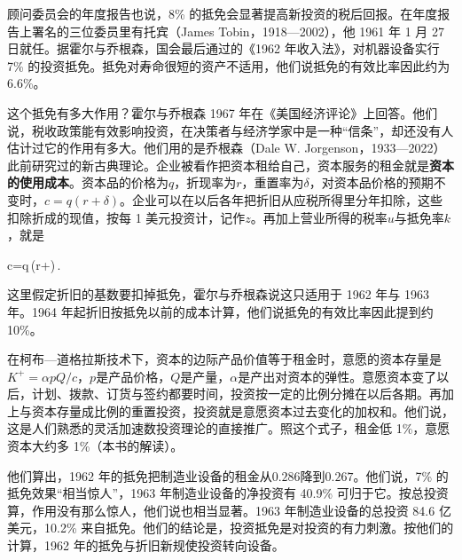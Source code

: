 顾问委员会的年度报告也说，8\% 的抵免会显著提高新投资的税后回报\cite{erp1962}。在年度报告上署名的三位委员里有托宾（James Tobin，1918—2002），他 1961 年 1 月 27 日就任\cite{erp1962,loc39}。据霍尔与乔根森，国会最后通过的《1962 年收入法》，对机器设备实行 7\% 的投资抵免\cite{hj1967}。抵免对寿命很短的资产不适用，他们说抵免的有效比率因此约为 6.6\%\cite{hj1967}。

这个抵免有多大作用？霍尔与乔根森 1967 年在《美国经济评论》上回答\cite{hj1967}。他们说，税收政策能有效影响投资，在决策者与经济学家中是一种“信条”，却还没有人估计过它的作用有多大\cite{hj1967}。他们用的是乔根森（Dale W. Jorgenson，1933—2022）此前研究过的新古典理论\cite{hj1967,loc39,gnd39}。企业被看作把资本租给自己，资本服务的租金就是\textbf{资本的使用成本}\cite{hj1967}。资本品的价格为$q$，折现率为$r$，重置率为$\delta$，对资本品价格的预期不变时，$c=q(r+\delta)$\cite{hj1967}。企业可以在以后各年把折旧从应税所得里分年扣除，这些扣除折成的现值，按每 1 美元投资计，记作$z$\cite{hj1967}。再加上营业所得的税率$u$与抵免率$k$，就是
\begin{keyeq}
c=q\,(r+\delta)\,.\label{eq:consumption-usercost}
\end{keyeq}
这里假定折旧的基数要扣掉抵免，霍尔与乔根森说这只适用于 1962 年与 1963 年\cite{hj1967}。1964 年起折旧按抵免以前的成本计算，他们说抵免的有效比率因此提到约 10\%\cite{hj1967}。

在柯布—道格拉斯技术下，资本的边际产品价值等于租金时，意愿的资本存量是$K^{+}=\alpha pQ/c$，$p$是产品价格，$Q$是产量，$\alpha$是产出对资本的弹性\cite{hj1967}。意愿资本变了以后，计划、拨款、订货与签约都要时间，投资按一定的比例分摊在以后各期\cite{hj1967}。再加上与资本存量成比例的重置投资，投资就是意愿资本过去变化的加权和\cite{hj1967}。他们说，这是人们熟悉的灵活加速数投资理论的直接推广\cite{hj1967}。照这个式子，租金低 1\%，意愿资本大约多 1\%（本书的解读）。

他们算出，1962 年的抵免把制造业设备的租金从$0.286$降到$0.267$\cite{hj1967}。他们说，7\% 的抵免效果“相当惊人”，1963 年制造业设备的净投资有 40.9\% 可归于它\cite{hj1967}。按总投资算，作用没有那么惊人，他们说也相当显著\cite{hj1967}。1963 年制造业设备的总投资 84.6 亿美元，10.2\% 来自抵免\cite{hj1967}。他们的结论是，投资抵免是对投资的有力刺激\cite{hj1967}。按他们的计算，1962 年的抵免与折旧新规使投资转向设备\cite{hj1967}。


